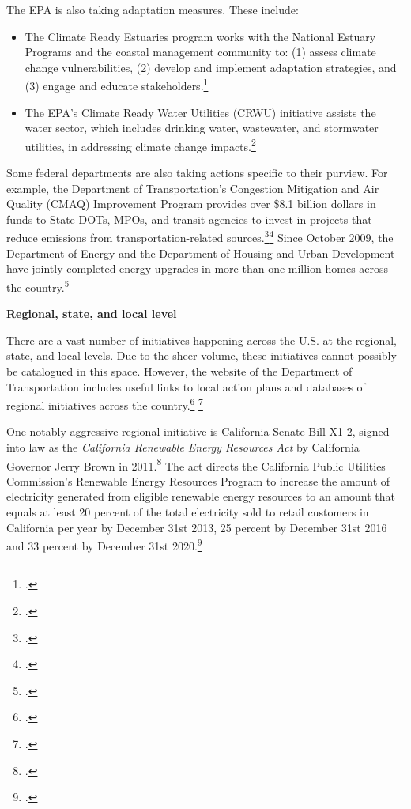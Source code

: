 The EPA is also taking adaptation measures. These include:	
\begin{itemize}
	\item The Climate Ready Estuaries program works with the National Estuary Programs and the coastal management community to: (1) assess climate change vulnerabilities, (2) develop and implement adaptation strategies, and (3) engage and educate stakeholders.\footcite[][]{EPAwater} 
	\item The EPA's Climate Ready Water Utilities (CRWU) initiative assists the water sector, which includes drinking water, wastewater, and stormwater utilities, in addressing climate change impacts.\footcite[][]{EPAwaterutilities}
\end{itemize}
	
	

Some federal departments are also taking actions specific to their purview. For example, the Department of Transportation’s Congestion Mitigation and Air Quality (CMAQ) Improvement Program provides over \$8.1 billion dollars in funds to State DOTs, MPOs, and transit agencies to invest in projects that reduce emissions from transportation-related sources.\footcite[][]{CMAQ}\footcite[][]{CMAQProgram} Since October 2009, the Department of Energy and the Department of Housing and Urban Development have jointly completed energy upgrades in more than one million homes across the country.\footcite[][]{WHenergy}



\textbf{Regional, state, and local level}



There are a vast number of initiatives happening across the U.S. at the regional, state, and local levels. 
Due to the sheer volume, these initiatives cannot possibly be catalogued in this space. 
However, the website of the Department of Transportation includes useful links to local action plans and databases of regional initiatives across the country.\footcite[][]{USDTaction} \footcite[][]{USDTinitiatives}



One notably aggressive regional initiative is California Senate Bill X1-2, signed into law as the \emph{California Renewable Energy Resources Act} by California Governor Jerry Brown in 2011.\footcite[][]{CaliSBX12}
The act directs the California Public Utilities Commission's Renewable Energy Resources Program to increase the amount of electricity generated from eligible renewable energy resources to an amount that equals at least 20 percent of the total electricity sold to retail customers in California per year by December 31st 2013, 25 percent by December 31st 2016 and 33 percent by December 31st 2020.\footcite[][]{CaliforniaRenewableOverview}



